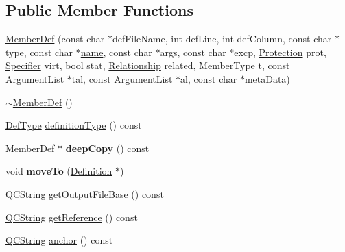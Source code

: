 \subsection*{Public Member Functions}
\begin{DoxyCompactItemize}
\item 
\mbox{\hyperlink{class_member_def_ad309cc9f07a9268c5071c24d167e2c74}{Member\+Def}} (const char $\ast$def\+File\+Name, int def\+Line, int def\+Column, const char $\ast$type, const char $\ast$\mbox{\hyperlink{class_definition_a9324000f785d7b6b098878a3bca4df5b}{name}}, const char $\ast$args, const char $\ast$excp, \mbox{\hyperlink{types_8h_a90e352184df58cd09455fe9996cd4ded}{Protection}} prot, \mbox{\hyperlink{types_8h_ab16236bdd10ddf4d73a9847350f0017e}{Specifier}} virt, bool stat, \mbox{\hyperlink{types_8h_a9d625fe894d9313ec78df1d78553f32e}{Relationship}} related, Member\+Type t, const \mbox{\hyperlink{class_argument_list}{Argument\+List}} $\ast$tal, const \mbox{\hyperlink{class_argument_list}{Argument\+List}} $\ast$al, const char $\ast$meta\+Data)
\item 
\mbox{\hyperlink{class_member_def_a2c5a0de011bf7fcfd2e97b66b6ea5a49}{$\sim$\+Member\+Def}} ()
\item 
\mbox{\hyperlink{class_definition_intf_ada60114bc621669dd8c19edfc6421766}{Def\+Type}} \mbox{\hyperlink{class_member_def_a0c16b4d5effd11dbf337ece47b0d7463}{definition\+Type}} () const
\item 
\mbox{\label{class_member_def_a952902b4a3dff77b95216f2716029007}} 
\mbox{\hyperlink{class_member_def}{Member\+Def}} $\ast$ {\bfseries deep\+Copy} () const
\item 
\mbox{\label{class_member_def_a969464d35aace74201c61cdbd8c507bb}} 
void {\bfseries move\+To} (\mbox{\hyperlink{class_definition}{Definition}} $\ast$)
\item 
\mbox{\hyperlink{class_q_c_string}{Q\+C\+String}} \mbox{\hyperlink{class_member_def_afafa6a560b69558c5d3c8bba0424c939}{get\+Output\+File\+Base}} () const
\item 
\mbox{\hyperlink{class_q_c_string}{Q\+C\+String}} \mbox{\hyperlink{class_member_def_a96b40b99dcb42feaf5cb9de1bf784f0f}{get\+Reference}} () const
\item 
\mbox{\hyperlink{class_q_c_string}{Q\+C\+String}} \mbox{\hyperlink{class_member_def_a1ef7c726fdd0f1dd2d006782dd6f766a}{anchor}} () const
\item 
\mbox{\label{class_member_def_afe8fd599c08b15ee140459464f4c4906}} 

\end{DoxyCompactItemize}
